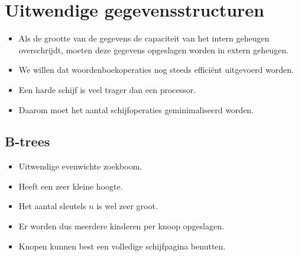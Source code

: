 \chapter{Uitwendige gegevensstructuren}
\begin{itemize}
    \item Als de grootte van de gegevens de capaciteit van het intern geheugen overschrijdt, moeten deze gegevens opgeslagen worden in extern geheugen.
    \item We willen dat woordenboekoperaties nog steeds efficiënt uitgevoerd worden.
    \item Een harde schijf is veel trager dan een processor.
    \item Daarom moet het aantal schijfoperaties geminimaliseerd worden.
\end{itemize}

\section{B-trees}
\begin{itemize}
    \item Uitwendige evenwichte zoekboom.
    \item Heeft een zeer kleine hoogte.
    \item Het aantal sleutels $n$ is wel zeer groot.
    \item Er worden dus meerdere kinderen per knoop opgeslagen.
    \item Knopen kunnen best een volledige schijfpagina benutten.
\end{itemize}

